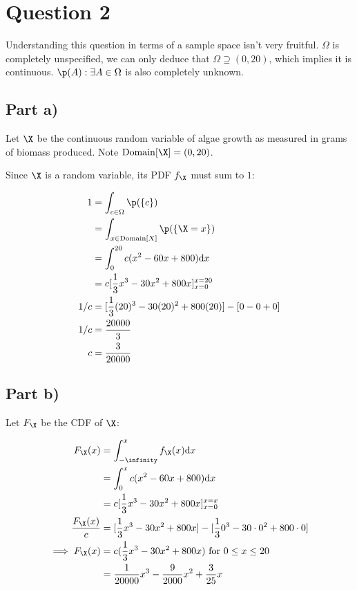 \newpage

\section*{Question 2}

Understanding this question in terms of a sample space isn't very fruitful.
$\Omega$ is completely unspecified, we can only deduce that $\Omega \supseteq (0, 20)$, which implies it is continuous.
$\p (A) : \exists A \in \Omega$ is also completely unknown.

\subsection*{Part a)}

Let $\X$ be the continuous random variable of algae growth as measured in grams of biomass produced.
Note $\mathrm{Domain}[\X] = (0, 20)$.

Since $\X$ is a random variable, its PDF $f_{\X}$ must sum to $1$:

\begin{align*}
1 &= \int _{c \in \Omega} \p (\{ c \}) \\
&= \int _{x \in \mathrm{Domain}[X]} \p(\{ \X = x \}) \\
&= \int _0 ^{20} c(x^2 - 60x + 800) \mathrm{d}x \\
&= c[\frac{1}{3}x^3 - 30x^2 + 800x]_{x = 0}^{x=20} \\
1/c &= [\frac{1}{3}(20)^3 - 30(20)^2 + 800(20)] - [0 - 0 + 0] \\
1/c &= \frac{20000}{3} \\
c &= \frac{3}{20000}
\end{align*}

\subsection*{Part b)}

Let $F_{\X}$ be the CDF of $\X$:

\begin{align*}
F_{\X}(x) &= \int _{-\infinity} ^{x} f_{\X}(x) \mathrm{d}x \\
&= \int _0 ^{x} c(x^2 - 60x + 800) \mathrm{d}x \\
&= c [\frac{1}{3}x^3 - 30x^2 + 800x]_{x =0}^{x = x} \\
\frac{F_{\X}(x)}{c} &= [\frac{1}{3} x^3 - 30x^2 + 800x] - [\frac{1}{3} 0^3 - 30\cdot0^2 + 800\cdot0] \\
\implies F_{\X}(x) &= c(\frac{1}{3} x^3 - 30x^2 + 800x) \text{ for } 0 \leq x \leq 20 \\
&= \frac{1}{20000}x^3 - \frac{9}{2000}x^2 + \frac{3}{25}x
\end{align*}

